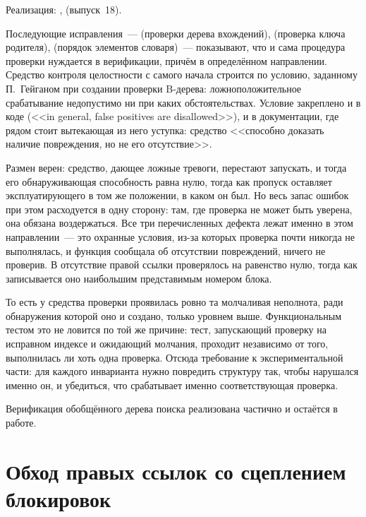 Реализация: ,  (выпуск~18).

Последующие исправления~---  (проверки дерева вхождений),
 (проверка ключа родителя),  (порядок
элементов словаря)~--- показывают, что и сама процедура проверки нуждается в
верификации, причём в определённом направлении. Средство контроля целостности
с самого начала строится по условию, заданному П.~Гейганом при создании
проверки B-дерева: ложноположительное срабатывание недопустимо ни при каких
обстоятельствах. Условие закреплено и в коде (<<in general, false positives are
disallowed>>), и в документации, где рядом стоит вытекающая из него уступка:
средство <<способно доказать наличие повреждения, но не его отсутствие>>.

Размен верен: средство, дающее ложные тревоги, перестают запускать, и тогда его
обнаруживающая способность равна нулю, тогда как пропуск оставляет
эксплуатирующего в том же положении, в каком он был. Но весь запас ошибок при
этом расходуется в одну сторону: там, где проверка не может быть уверена, она
обязана воздержаться. Все три перечисленных дефекта лежат именно в этом
направлении~--- это охранные условия, из-за которых проверка почти никогда не
выполнялась, и функция сообщала об отсутствии повреждений, ничего не проверив.
В  отсутствие правой ссылки проверялось на равенство нулю,
тогда как записывается оно наибольшим представимым номером блока.

То есть у средства проверки проявилась ровно та молчаливая неполнота, ради
обнаружения которой оно и создано, только уровнем выше. Функциональным тестом
это не ловится по той же причине: тест, запускающий проверку на исправном
индексе и ожидающий молчания, проходит независимо от того, выполнилась ли хоть
одна проверка. Отсюда требование к экспериментальной части: для каждого
инварианта нужно повредить структуру так, чтобы нарушался именно он, и
убедиться, что срабатывает именно соответствующая проверка.

Верификация обобщённого дерева поиска реализована частично и остаётся в
работе.


\section{Обход правых ссылок со сцеплением блокировок}

